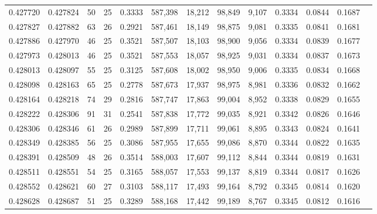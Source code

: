 \begin{tabular}{rrrrrrrrrrrrr}
0.427720 & 0.427824 &    50 &  25 &                                     0.3333 & 587,398 &  18,212 &  98,849 &   9,107 & 0.3334 & 0.0844 & 0.1687 \\
0.427827 & 0.427882 &    63 &  26 &                                     0.2921 & 587,461 &  18,149 &  98,875 &   9,081 & 0.3335 & 0.0841 & 0.1681 \\
0.427886 & 0.427970 &    46 &  25 &                                     0.3521 & 587,507 &  18,103 &  98,900 &   9,056 & 0.3334 & 0.0839 & 0.1677 \\
0.427973 & 0.428013 &    46 &  25 &                                     0.3521 & 587,553 &  18,057 &  98,925 &   9,031 & 0.3334 & 0.0837 & 0.1673 \\
0.428013 & 0.428097 &    55 &  25 &                                     0.3125 & 587,608 &  18,002 &  98,950 &   9,006 & 0.3335 & 0.0834 & 0.1668 \\
0.428098 & 0.428163 &    65 &  25 &                                     0.2778 & 587,673 &  17,937 &  98,975 &   8,981 & 0.3336 & 0.0832 & 0.1662 \\
0.428164 & 0.428218 &    74 &  29 &                                     0.2816 & 587,747 &  17,863 &  99,004 &   8,952 & 0.3338 & 0.0829 & 0.1655 \\
0.428222 & 0.428306 &    91 &  31 &                                     0.2541 & 587,838 &  17,772 &  99,035 &   8,921 & 0.3342 & 0.0826 & 0.1646 \\
0.428306 & 0.428346 &    61 &  26 &                                     0.2989 & 587,899 &  17,711 &  99,061 &   8,895 & 0.3343 & 0.0824 & 0.1641 \\
0.428349 & 0.428385 &    56 &  25 &                                     0.3086 & 587,955 &  17,655 &  99,086 &   8,870 & 0.3344 & 0.0822 & 0.1635 \\
0.428391 & 0.428509 &    48 &  26 &                                     0.3514 & 588,003 &  17,607 &  99,112 &   8,844 & 0.3344 & 0.0819 & 0.1631 \\
0.428511 & 0.428551 &    54 &  25 &                                     0.3165 & 588,057 &  17,553 &  99,137 &   8,819 & 0.3344 & 0.0817 & 0.1626 \\
0.428552 & 0.428621 &    60 &  27 &                                     0.3103 & 588,117 &  17,493 &  99,164 &   8,792 & 0.3345 & 0.0814 & 0.1620 \\
0.428628 & 0.428687 &    51 &  25 &                                     0.3289 & 588,168 &  17,442 &  99,189 &   8,767 & 0.3345 & 0.0812 & 0.1616 \\

\end{tabular}
